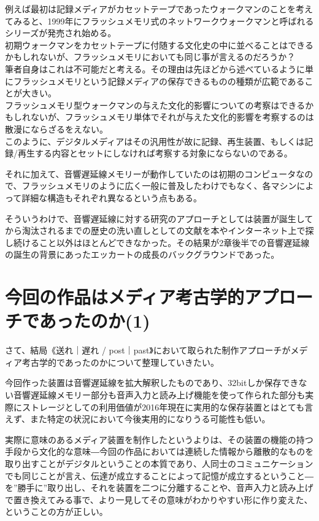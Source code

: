\documentclass[a4paper,report]{jsbook}
\begin{document}
例えば最初は記録メディアがカセットテープであったウォークマンのことを考えてみると、1999年にフラッシュメモリ式のネットワークウォークマンと呼ばれるシリーズが発売され始める。\\
初期ウォークマンをカセットテープに付随する文化史の中に並べることはできるかもしれないが、フラッシュメモリにおいても同じ事が言えるのだろうか？\\
筆者自身はこれは不可能だと考える。その理由は先ほどから述べているように単にフラッシュメモリという記録メディアの保存できるものの種類が広範であることが大きい。\\
フラッシュメモリ型ウォークマンの与えた文化的影響についての考察はできるかもしれないが、フラッシュメモリ単体でそれが与えた文化的影響を考察するのは散漫にならざるをえない。\\
このように、デジタルメディアはその汎用性が故に記録、再生装置、もしくは記録/再生する内容とセットにしなければ考察する対象にならないのである。

それに加えて、音響遅延線メモリーが動作していたのは初期のコンピュータなので、フラッシュメモリのように広く一般に普及したわけでもなく、各マシンによって詳細な構造もそれぞれ異なるという点もある。

そういうわけで、音響遅延線に対する研究のアプローチとしては装置が誕生してから淘汰されるまでの歴史の洗い直しとしての文献を本やインターネット上で探し続けること以外はほとんどできなかった。その結果が2章後半での音響遅延線の誕生の背景にあったエッカートの成長のバックグラウンドであった。

\section{今回の作品はメディア考古学的アプローチであったのか(1)}\label{ux4ecaux56deux306eux4f5cux54c1ux306fux30e1ux30c7ux30a3ux30a2ux8003ux53e4ux5b66ux7684ux30a2ux30d7ux30edux30fcux30c1ux3067ux3042ux3063ux305fux306eux304b1}

さて、結局《送れ｜遅れ /
post｜past》において取られた制作アプローチがメディア考古学的であったのかについて整理していきたい。

今回作った装置は音響遅延線を拡大解釈したものであり、32bitしか保存できない音響遅延線メモリー部分も音声入力と読み上げ機能を使って作られた部分も実際にストレージとしての利用価値が2016年現在に実用的な保存装置とはとても言えず、また特定の状況において今後実用的になりうる可能性も低い。

実際に意味のあるメディア装置を制作したというよりは、その装置の機能の持つ手段から文化的な意味―今回の作品においては連続した情報から離散的なものを取り出すことがデジタルということの本質であり、人同士のコミュニケーションでも同じことが言え、伝達が成立することによって記憶が成立するということ―を''勝手に''取り出し、それを装置を二つに分離することや、音声入力と読み上げで置き換えてみる事で、より一見してその意味がわかりやすい形に作り変えた、ということの方が正しい。
\end{document}
